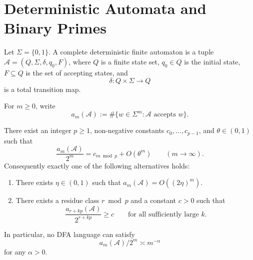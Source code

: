 \section{Deterministic Automata and Binary Primes}
\label{sec:automata}

\begin{definition}\label{def:dfa}
Let \(\Sigma=\{0,1\}\). A complete deterministic finite automaton is a
tuple \(\mathcal A=(Q,\Sigma,\delta,q_0,F)\), where \(Q\) is a finite
state set, \(q_0\in Q\) is the initial state, \(F\subseteq Q\) is the
set of accepting states, and
\[
  \delta:Q\times\Sigma\to Q
\]
is a total transition map.
\end{definition}

For \(m\ge 0\), write
\[
  a_m(\mathcal A)
  :=\#\{w\in\Sigma^m:\mathcal A\text{ accepts }w\}.
\]

\begin{theorem}
  \label{thm:dfa-density-dichotomy}
  There exist an integer \(p\ge 1\), non-negative constants
  \(c_0,\dots,c_{p-1}\), and \(\theta\in(0,1)\) such that
  \[
    \frac{a_m(\mathcal A)}{2^m}=c_{m\bmod p}+O(\theta^m)
    \qquad (m\to\infty).
  \]
  Consequently exactly one of the following alternatives holds:
  \begin{enumerate}[label=\textup{(\roman*)}]
    \item There exists \(\eta\in(0,1)\) such that
    \(a_m(\mathcal A)=O((2\eta)^m)\).
    \item There exists a residue class \(r\bmod p\) and a constant
    \(c>0\) such that
    \[
      \frac{a_{r+kp}(\mathcal A)}{2^{r+kp}}\ge c
      \qquad\text{for all sufficiently large }k.
    \]
  \end{enumerate}
  In particular, no DFA language can satisfy
  \[
    a_m(\mathcal A)/2^m\asymp m^{-\alpha}
  \]
  for any \(\alpha>0\).
\end{theorem}


